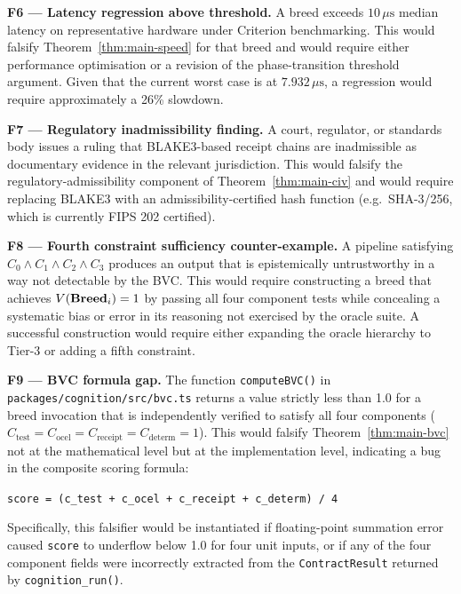\medskip
\textbf{F6 — Latency regression above threshold.} A breed exceeds $10\,\mu\mathrm{s}$
median latency on representative hardware under Criterion benchmarking. This would
falsify Theorem~\ref{thm:main-speed} for that breed and would require either
performance optimisation or a revision of the phase-transition threshold argument.
Given that the current worst case is \PROLOG{} at $7.932\,\mu\mathrm{s}$, a regression
would require approximately a 26\% slowdown.

\medskip
\textbf{F7 — Regulatory inadmissibility finding.} A court, regulator, or standards body
issues a ruling that BLAKE3-based receipt chains are inadmissible as documentary evidence
in the relevant jurisdiction. This would falsify the regulatory-admissibility component
of Theorem~\ref{thm:main-civ} and would require replacing BLAKE3 with an
admissibility-certified hash function (e.g.\ SHA-3/256, which is currently FIPS 202
certified).

\medskip
\textbf{F8 — Fourth constraint sufficiency counter-example.} A pipeline satisfying
$C_0 \wedge C_1 \wedge C_2 \wedge C_3$ produces an output that is epistemically
untrustworthy in a way not detectable by the BVC. This would require constructing a
breed that achieves $V(\mathbf{Breed}_i) = 1$ by passing all four component tests while
concealing a systematic bias or error in its reasoning not exercised by the oracle suite.
A successful construction would require either expanding the oracle hierarchy to Tier-3
or adding a fifth constraint.

\medskip
\textbf{F9 — BVC formula gap.} The function \texttt{computeBVC()} in
\texttt{packages/cognition/src/bvc.ts} returns a value strictly less than 1.0 for a
breed invocation that is independently verified to satisfy all four components
($C_{\mathrm{test}} = C_{\mathrm{ocel}} = C_{\mathrm{receipt}} = C_{\mathrm{determ}} = 1$).
This would falsify Theorem~\ref{thm:main-bvc} not at the mathematical level but at the
implementation level, indicating a bug in the composite scoring formula:
\begin{center}
\texttt{score = (c\_test + c\_ocel + c\_receipt + c\_determ) / 4}
\end{center}
Specifically, this falsifier would be instantiated if floating-point summation error
caused \texttt{score} to underflow below 1.0 for four unit inputs, or if any of the
four component fields were incorrectly extracted from the \texttt{ContractResult}
returned by \texttt{cognition\_run()}.

